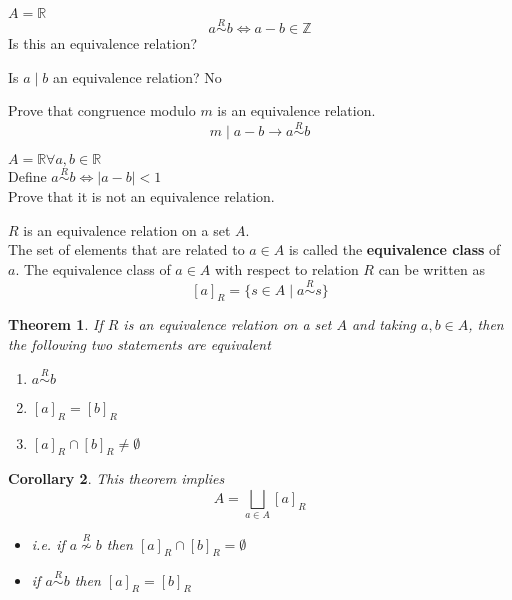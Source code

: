 \documentclass[letterpaper, 12pt]{article}
\newtheorem{theorem}{Theorem}[section]
\newtheorem{corollary}[theorem]{Corollary}
\newenvironment{definition}[1][Definition]{\begin{trivlist}
\item[\hskip \labelsep {\bfseries #1}]}{\end{trivlist}}
\newenvironment{example}[1][Example]{\begin{trivlist}
\item[\hskip \labelsep {\bfseries #1}]}{\end{trivlist}}
\newcommand{\keyword}[1]{\textbf{#1}}
\newcommand{\then}{\rightarrow}
\newcommand{\Z}{\mathbb{Z}}
\newcommand{\R}{\mathbb{R}}
\newcommand{\0}{\emptyset}
\begin{document}
    \begin{example}
        $A = \R$ \\
        \[a \overset{R}{\sim} b \iff a-b \in \Z\]
        Is this an equivalence relation?
    \end{example}
    \begin{example}
        Is $a \mid b$ an equivalence relation? No
    \end{example}
    \begin{example}
        Prove that congruence modulo $m$ is an equivalence relation.
        \[m \mid a - b \then a \overset{R}{\sim} b\]
    \end{example}
    \begin{example}
        $A = \R \forall a, b \in \R$ \\
        Define $a \overset{R}{\sim} b \iff |a-b| < 1$ \\
        Prove that it is not an equivalence relation.
    \end{example}
    \begin{definition}
        $R$ is an equivalence relation on a set $A$. \\
        The set of elements that are related to $a \in A$ is called the \keyword{equivalence class} 
        of $a$. The equivalence class of $a \in A$ with respect to relation $R$ can be written as 
        \[[a]_R = \{s \in A \mid a \overset{R}{\sim} s\}\]
    \end{definition}
    \begin{theorem}
        If $R$ is an equivalence relation on a set $A$ and taking $a, b \in A$, then the following 
        two statements are equivalent
        \begin{enumerate}
            \item $a \overset{R}{\sim} b$
            \item $[a]_R = [b]_R$
            \item $[a]_R \cap [b]_R \ne \emptyset$
        \end{enumerate}
    \end{theorem}
    \begin{corollary}
        This theorem implies 
        \[A = \bigsqcup_{a \in A} [a]_R\]
        \begin{itemize}
            \item i.e. if $a \overset{R}{\nsim} b$ then $[a]_R \cap [b]_R = \emptyset$
            \item if $a \overset{R}{\sim} b$ then $[a]_R = [b]_R$
        \end{itemize}
    \end{corollary}
\end{document}
